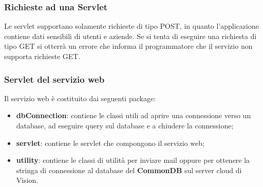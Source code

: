 \subsubsection{Richieste ad una Servlet}

Le servlet supportano solamente richieste di tipo POST, in quanto l'applicazione contiene dati sensibili di utenti e aziende.
Se si tenta di eseguire una richiesta di tipo GET si otterrà un errore che informa il programmatore che il servizio non supporta richieste GET.

\subsubsection{Servlet del servizio web} \label{servlet}

Il servizio web è costituito dai seguenti package:
\begin{itemize}
	\item \textbf{dbConnection}: contiene le classi utili ad aprire una connessione verso un database, ad eseguire query sul database e a chiudere la connessione;
	\item \textbf{servlet}: contiene le servlet che compongono il servizio web;
	\item \textbf{utility}: contiene le classi di utilità per inviare mail oppure per ottenere la stringa di connessione al database del \textbf{CommonDB} sul server cloud di Vision.
\end{itemize}














